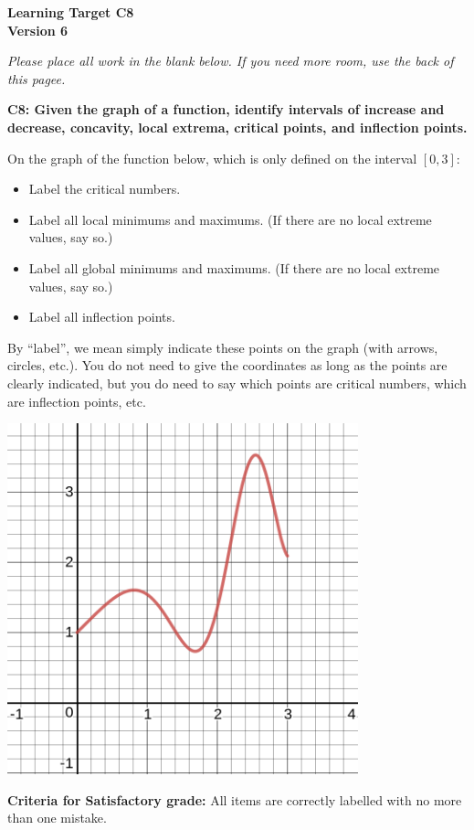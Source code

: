 \documentclass[10pt]{article}
\begin{document}
	\vspace*{0in}

		\begin{center}
			\textbf{Learning Target C8 \\
			Version 6}
		\end{center}

\emph{Please place all work in the blank below. If you need more room, use the back of this pagee.}

\begin{framed}
	\textbf{C8: Given the graph of a function, identify intervals of increase and decrease, concavity, local extrema, critical points, and inflection points. }
\end{framed}


On the graph of the function below, which is only defined on the interval $[0,3]$: 

\begin{itemize}
    \item Label the critical numbers. 
    \item Label all local minimums and maximums. (If there are no local extreme values, say so.) 
    \item Label all global minimums and maximums. (If there are no local extreme values, say so.) 
    \item Label all inflection points. 
\end{itemize}
By ``label'', we mean simply indicate these points on the graph (with arrows, circles, etc.). You do not need to give the coordinates as long as the points are clearly indicated, but you do need to say which points are critical numbers, which are inflection points, etc. 

\begin{center}
    \includegraphics[width=4in]{ltc8-nov19.png}
\end{center}

\vfill

\begin{small}
    \begin{framed}
        	\textbf{Criteria for Satisfactory grade:} All items are correctly labelled with no more than one mistake. 
    \end{framed}

\end{small}
\end{document}
